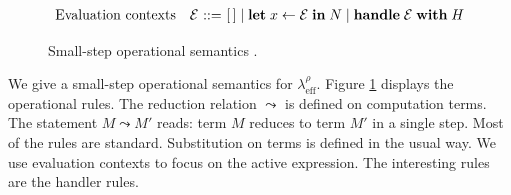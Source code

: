 \documentclass[12pt,mscres,cdtppar,twoside,openright,logo,rightchapter,normalheadings]{infthesis}
\makeatletter
\theoremstyle{definition}
\newcommand{\Calc}{\ensuremath{\lambda_{\text{eff}}^\rho}\xspace}
\newcommand{\slab}[1]{\textrm{#1}}
\newcommand{\semlab}[1]{\text{\scshape{S-#1}}}
\newcommand{\revto}{\ensuremath{\leftarrow}}
\newcommand{\keyw}[1]{\textbf{#1}}
\newcommand{\Handle}{\keyw{handle}}
\newcommand{\With}{\keyw{with}}
\newcommand{\Let}{\keyw{let}}
\newcommand{\In}{\keyw{in}}
\newcommand{\Do}{\keyw{do}}
\newcommand{\Return}{\keyw{return}}
\newcommand{\Case}{\keyw{case}}
\newcommand{\Record}[1]{\ensuremath{\langle #1 \rangle}}
\newcommand{\reducesto}[0]{\ensuremath{\leadsto}}
\newcommand{\ba}{\begin{array}}
\newcommand{\ea}{\end{array}}
\newenvironment{syntax}{\[\ba{@{}l@{\quad}r@{~}c@{~}l@{}}}{\ea\]\ignorespacesafterend}
\newenvironment{reductions}{\[\ba{@{}l@{\qquad}@{}r@{~~}c@{~~}l@{}}}{\ea\]\ignorespacesafterend}
\makeatother
\begin{document}
\begin{figure}
\begin{mathpar}
\end{mathpar}
\begin{syntax}
\slab{Evaluation contexts} &  \mathcal{E} &::=& [\,] \mid \Let \; x \revto \mathcal{E} \; \In \; N \mid \Handle \; \mathcal{E} \; \With \; H
\end{syntax}

\caption{Small-step operational semantics \citep{Hillerstrom2016a}.}
\label{fig:small-step}
\end{figure}
We give a small-step operational semantics for \Calc. Figure
\ref{fig:small-step} displays the operational rules. The reduction
relation $\reducesto$ is defined on computation terms. The statement
$M \reducesto M'$ reads: term $M$ reduces to term $M'$ in a single
step. Most of the rules are standard. Substitution on terms is defined
in the usual way. We use evaluation contexts to focus on the active
expression. The interesting rules are the handler rules.
\end{document}
